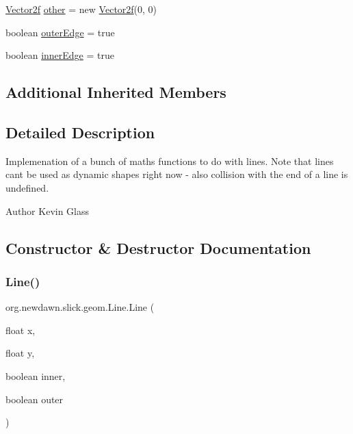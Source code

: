\begin{DoxyCompactItemize}
\item 
\mbox{\hyperlink{classorg_1_1newdawn_1_1slick_1_1geom_1_1_vector2f}{Vector2f}} \mbox{\hyperlink{classorg_1_1newdawn_1_1slick_1_1geom_1_1_line_a9e03a0c3036406f4c22a6486a23d0b4f}{other}} = new \mbox{\hyperlink{classorg_1_1newdawn_1_1slick_1_1geom_1_1_vector2f}{Vector2f}}(0, 0)
\item 
boolean \mbox{\hyperlink{classorg_1_1newdawn_1_1slick_1_1geom_1_1_line_a0ea0ca895c5d80eed7f4e3cfe1494c37}{outer\+Edge}} = true
\item 
boolean \mbox{\hyperlink{classorg_1_1newdawn_1_1slick_1_1geom_1_1_line_afa2d642a41ebc75b74e5776e623d5328}{inner\+Edge}} = true
\end{DoxyCompactItemize}
\subsection*{Additional Inherited Members}


\subsection{Detailed Description}
Implemenation of a bunch of maths functions to do with lines. Note that lines can\textquotesingle{}t be used as dynamic shapes right now -\/ also collision with the end of a line is undefined.

\begin{DoxyAuthor}{Author}
Kevin Glass 
\end{DoxyAuthor}


\subsection{Constructor \& Destructor Documentation}
\mbox{\label{classorg_1_1newdawn_1_1slick_1_1geom_1_1_line_ac9021e18e16cb5a32d0d9f83009c1c0f}} 
\subsubsection{\texorpdfstring{Line()}{Line()}\hspace{0.1cm}{\footnotesize\ttfamily [1/6]}}
{\footnotesize\ttfamily org.\+newdawn.\+slick.\+geom.\+Line.\+Line (\begin{DoxyParamCaption}\item[{float}]{x,  }\item[{float}]{y,  }\item[{boolean}]{inner,  }\item[{boolean}]{outer }\end{DoxyParamCaption})\hspace{0.3cm}{\ttfamily [inline]}}

